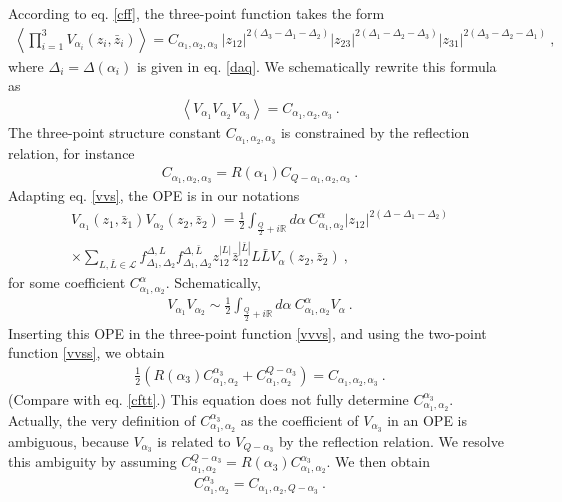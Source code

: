 \documentclass[12pt, a4paper, notitlepage, twoside]{report}
\numberwithin{equation}{section}
\theoremstyle{break}
\begin{document}
According to eq. \eqref{cff}, the three-point function takes the form
\begin{align}
\left\langle \prod_{i=1}^3 V_{\alpha_i}(z_i,\bar{z}_i)\right\rangle = C_{\alpha_1,\alpha_2,\alpha_3}\ |z_{12}|^{2(\Delta_3-\Delta_1-\Delta_2)} |z_{23}|^{2(\Delta_1-\Delta_2-\Delta_3)} |z_{31}|^{2(\Delta_3-\Delta_2-\Delta_1)}\ ,
\label{vvv}
\end{align}
where $\Delta_i = \Delta(\alpha_i)$ is given in eq. \eqref{daq}.
We schematically rewrite this formula as 
\begin{align}
 \boxed{ \left\langle V_{\alpha_1}V_{\alpha_2}V_{\alpha_3} \right\rangle = C_{\alpha_1,\alpha_2,\alpha_3} }\ .
\label{vvvs}
\end{align}
The three-point structure constant $C_{\alpha_1,\alpha_2,\alpha_3}$ is constrained by the reflection relation, for instance
\begin{align}
 C_{\alpha_1,\alpha_2,\alpha_3} = R(\alpha_1) C_{Q-\alpha_1,\alpha_2,\alpha_3}\ .
\label{crc}
\end{align}
Adapting eq. \eqref{vvs}, the OPE is in our notations
\begin{multline}
 V_{\alpha_1}(z_1,\bar{z}_1) V_{\alpha_2}(z_2,\bar{z}_2) = \frac12 \int_{\frac{Q}{2}+i{\mathbb{R}}} d\alpha\ C_{\alpha_1,\alpha_2}^\alpha |z_{12}|^{2(\Delta-\Delta_1-\Delta_2)} 
\\ \times 
\sum_{L,\bar{L}\in \mathcal{L}} f_{\Delta_1,\Delta_2}^{\Delta,L} f_{\Delta_1,\Delta_2}^{\Delta,\bar{L}}z_{12}^{|L|} \bar{z}_{12}^{|\bar{L}|} L\bar{L} V_{\alpha}(z_2,\bar{z}_2) \ , 
\label{vvh}
\end{multline}
for some coefficient $C_{\alpha_1,\alpha_2}^\alpha$.
Schematically,
\begin{align}
 \boxed{V_{\alpha_1}V_{\alpha_2} \sim \frac12\int_{\frac{Q}{2}+i{\mathbb{R}}} d\alpha\ C_{\alpha_1,\alpha_2}^{\alpha} V_\alpha}\ .
\label{vvi}
\end{align}
Inserting this OPE in the three-point function \eqref{vvvs}, and using the two-point function \eqref{vvss}, we obtain
\begin{align}
 \frac12\left(R(\alpha_3)C_{\alpha_1,\alpha_2}^{\alpha_3} + C_{\alpha_1,\alpha_2}^{Q-\alpha_3}\right) = C_{\alpha_1,\alpha_2,\alpha_3}
\ . 
\label{hcc}
\end{align}
(Compare with eq. \eqref{cftt}.) 
This equation does not fully determine $C_{\alpha_1,\alpha_2}^{\alpha_3}$.
Actually, the very definition of $C_{\alpha_1,\alpha_2}^{\alpha_3}$ as the coefficient of $V_{\alpha_3}$ in an OPE is ambiguous, because $V_{\alpha_3}$ is related to $V_{Q-\alpha_3}$ by the reflection relation.
We  resolve this ambiguity by assuming $C_{\alpha_1,\alpha_2}^{Q-\alpha_3}=R(\alpha_3)C_{\alpha_1,\alpha_2}^{\alpha_3}$.
We then obtain
\begin{align}
 \boxed{C_{\alpha_1,\alpha_2}^{\alpha_3} = C_{\alpha_1,\alpha_2,Q-\alpha_3}}\ .
\label{cec}
\end{align}
\end{document}
